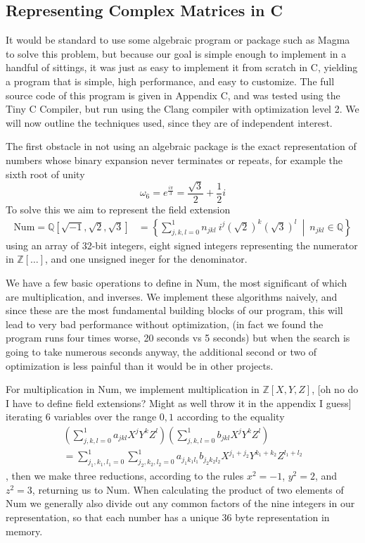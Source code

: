 \subsection{Representing Complex Matrices in C}
It would be standard to use some algebraic program or package such as Magma to solve this problem, but because our goal is simple enough to implement in a handful of sittings, it was just as easy to implement it from scratch in C, yielding a program that is simple, high performance, and easy to customize. The full source code of this program is given in Appendix C, and was tested using the Tiny C Compiler, but run using the Clang compiler with optimization level 2. We will now outline the techniques used, since they are of independent interest. 

The first obstacle in not using an algebraic package is the exact representation of numbers whose binary expansion never terminates or repeats, for example the sixth root of unity
\[\omega_6 = e^{\frac{i\pi}{3}} = \frac{\sqrt{3}}{2} + \frac{1}{2}i\]
To solve this we aim to represent the field extension
\begin{align*}
\text{Num} = \mathbb{Q}[\sqrt{-1}, \sqrt{2}, \sqrt{3}]
&= \left\{ \sum_{j,k,l = 0}^1 n_{jkl}\ i^j\left(\sqrt{2}\right)^k\left(\sqrt{3}\right)^l
\ \middle|\ n_{jkl} \in \mathbb{Q}\right\}
\end{align*}
using an array of 32-bit integers, eight signed integers representing the numerator in $\mathbb{Z}[\dots]$, and one unsigned ineger for the denominator.

We have a few basic operations to define in Num, the most significant of which are multiplication, and inverses. We implement these algorithms naively, and since these are the most fundamental building blocks of our program, this will lead to very bad performance without optimization, (in fact we found the program runs four times worse, 20 seconds vs 5 seconds) but when the search is going to take numerous seconds anyway, the additional second or two of optimization is less painful than it would be in other projects.

For multiplication in Num, we implement multiplication in $\mathbb{Z}[X, Y, Z]$, [oh no do I have to define field extensions? Might as well throw it in the appendix I guess] iterating 6 variables over the range ${0, 1}$ according to the equality
\begin{align*}
\left(\sum_{j,k,l = 0}^1 a_{jkl}X^jY^kZ^l\right)\left(\sum_{j,k,l = 0}^1 b_{jkl}X^jY^kZ^l\right)
\\= \sum_{j_1,k_1,l_1=0}^1\sum_{j_2,k_2,l_2=0}^1 a_{j_1k_1l_1}b_{j_2k_2l_2}X^{j_1+j_2}Y^{k_1+k_2}Z^{l_1+l_2}
\end{align*}
, then we make three reductions, according to the rules $x^2 = -1$, $y^2 = 2$, and $z^2 = 3$, returning us to Num. When calculating the product of two elements of Num we generally also divide out any common factors of the nine integers in our representation, so that each number has a unique 36 byte representation in memory.

